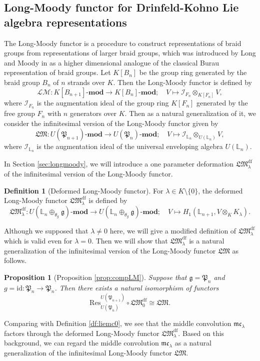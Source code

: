 \documentclass[a4paper,12pt]{article}
\newtheorem{prop}[thm]{Proposition}
\theoremstyle{definition}
\newtheorem{df}[thm]{Definition}
\theoremstyle{remark}
\begin{document}
\subsection{Long-Moody functor for Drinfeld-Kohno Lie algebra representations}
The Long-Moody functor is a procedure to construct representations of braid groups from representations of larger braid groups,
which was introduced by Long and Moody in \cite{Lo94} as a higher dimensional analogue of the classical Burau representation of braid groups.
Let $K[B_{n}]$ be the group ring generated by the braid group $B_{n}$ of $n$ strands over $K$.
Then the Long-Moody functor is defined by
\[
	\mathcal{LM}\colon K[B_{n+1}]\text{-}\mathrm{\mathbf{mod}}\to K[B_{n}]\text{-}\mathrm{\mathbf{mod}}; \quad V\mapsto \mathcal{I}_{F_{n}}\otimes_{K[F_{n}]}V,
\]
where $\mathcal{I}_{F_{n}}$ is the augmentation ideal of the group ring $K[F_{n}]$ generated by the free group $F_{n}$ with $n$ generators over $K$.
Then as a natural generalization of it, we consider the infinitesimal version of the Long-Moody functor given by 
\[
	\mathfrak{LM}\colon U(\mathfrak{P}_{n+1})\text{-}\mathrm{\mathbf{mod}}\to U(\mathfrak{P}_{n})\text{-}\mathrm{\mathbf{mod}}; \quad V\mapsto \mathcal{I}_{\mathbb{L}_{n}}\otimes_{U(\mathbb{L}_{n})}V,
\]
where $\mathcal{I}_{\mathbb{L}_{n}}$ is the augmentation ideal of the universal enveloping algebra $U(\mathbb{L}_{n})$.

In Section \ref{sec:longmoody}, we will introduce a one parameter deformation $\mathfrak{LM}_{\lambda}^{\mathrm{df}}$ of the infinitesimal version of the Long-Moody functor.
\begin{df}[Deformed Long-Moody functor]
For $\lambda\in K\setminus\{0\}$, the deformed Long-Moody functor $\mathfrak{LM}_{\lambda}^{\mathrm{df}}$ is defined by
\[
	\mathfrak{LM}^{\mathrm{df}}_{\lambda}\colon U(\mathbb{L}_{n}\oplus_{\theta_{g}} \mathfrak{g})\text{-}\mathbf{mod}\to 
	U(\mathbb{L}_{n}\oplus_{\theta_{g}} \mathfrak{g})\text{-}\mathbf{mod}; \quad V\mapsto H_{1}(\mathbb{L}_{n+1},V\otimes_{K}K_{\lambda}).
\]
\end{df}
Although we supposed that $\lambda\neq 0$ here, we will give a modified definition of $\mathfrak{LM}_{\lambda}^{\mathrm{df}}$ which is valid even for $\lambda=0$.
Then we will show that $\mathfrak{LM}^{\mathrm{df}}_{\lambda}$ is a natural generalization of the infinitesimal version of the Long-Moody functor $\mathfrak{LM}$
as follows.
\begin{prop}[Proposition \ref{prop:compLM}]
Suppose that $\mathfrak{g}=\mathfrak{P}_{n}$ and $g=\mathrm{id}\colon \mathfrak{P}_{n}\to \mathfrak{P}_{n}$.
Then there exists a natural isomorphism of functors
\[
	\mathrm{Res}_{U(\mathfrak{P}_{n})}^{U(\mathfrak{P}_{n+1})}\circ\mathfrak{LM}^{\mathrm{df}}_{0}\cong \mathfrak{LM}.
\]
\end{prop}
Comparing with Definition \ref{df:liemc0},
we see that 
the middle convolution $\mathfrak{mc}_{\lambda}$ factors through the deformed Long-Moody functor $\mathfrak{LM}^{\mathrm{df}}_{\lambda}$.
Based on this background, we can regard the middle convolution $\mathfrak{mc}_{\lambda}$ as a natural generalization of the infinitesimal Long-Moody functor $\mathfrak{LM}$.
\end{document}
